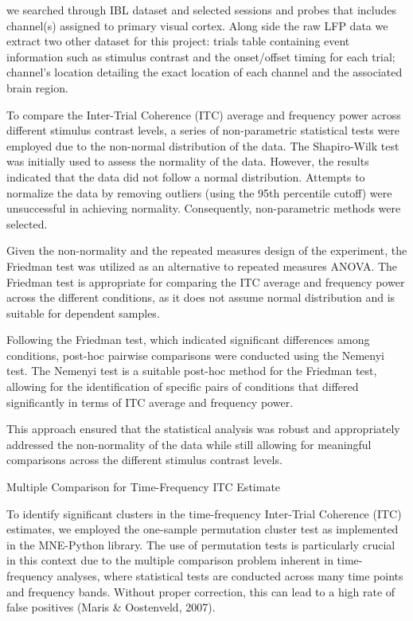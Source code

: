 \documentclass[
  letterpaper,
  DIV=11,
  numbers=noendperiod]{scrartcl}
\author{}
\date{}
\begin{document}
we searched through IBL dataset and selected sessions and probes that
includes channel(s) assigned to primary visual cortex. Along side the
raw LFP data we extract two other dataset for this project: trials table
containing event information such as stimulus contrast and the
onset/offset timing for each trial; channel's location detailing the
exact location of each channel and the associated brain region.

To compare the Inter-Trial Coherence (ITC) average and frequency power
across different stimulus contrast levels, a series of non-parametric
statistical tests were employed due to the non-normal distribution of
the data. The Shapiro-Wilk test was initially used to assess the
normality of the data. However, the results indicated that the data did
not follow a normal distribution. Attempts to normalize the data by
removing outliers (using the 95th percentile cutoff) were unsuccessful
in achieving normality. Consequently, non-parametric methods were
selected.

Given the non-normality and the repeated measures design of the
experiment, the Friedman test was utilized as an alternative to repeated
measures ANOVA. The Friedman test is appropriate for comparing the ITC
average and frequency power across the different conditions, as it does
not assume normal distribution and is suitable for dependent samples.

Following the Friedman test, which indicated significant differences
among conditions, post-hoc pairwise comparisons were conducted using the
Nemenyi test. The Nemenyi test is a suitable post-hoc method for the
Friedman test, allowing for the identification of specific pairs of
conditions that differed significantly in terms of ITC average and
frequency power.

This approach ensured that the statistical analysis was robust and
appropriately addressed the non-normality of the data while still
allowing for meaningful comparisons across the different stimulus
contrast levels.

Multiple Comparison for Time-Frequency ITC Estimate

To identify significant clusters in the time-frequency Inter-Trial
Coherence (ITC) estimates, we employed the one-sample permutation
cluster test as implemented in the MNE-Python library. The use of
permutation tests is particularly crucial in this context due to the
multiple comparison problem inherent in time-frequency analyses, where
statistical tests are conducted across many time points and frequency
bands. Without proper correction, this can lead to a high rate of false
positives (Maris \& Oostenveld, 2007).
\end{document}
